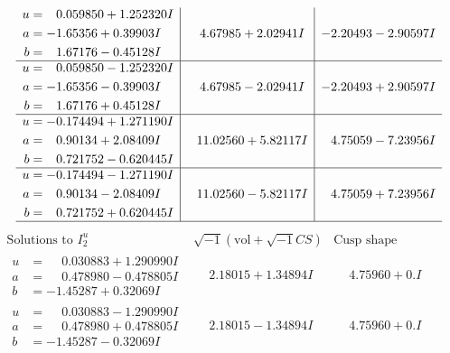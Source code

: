 \documentclass[1p]{elsarticle_modified}
\theoremstyle{definition}
\newcommand{\I}{\sqrt{-1}}
\begin{document}
$$\begin{array}{c|c|c}
\begin{aligned}
u &= \phantom{-}0.059850 + 1.252320 I \\
a &= -1.65356 + 0.39903 I \\
b &= \phantom{-}1.67176 - 0.45128 I\end{aligned}
 & \phantom{-}4.67985 + 2.02941 I & -2.20493 - 2.90597 I \\ \hline\begin{aligned}
u &= \phantom{-}0.059850 - 1.252320 I \\
a &= -1.65356 - 0.39903 I \\
b &= \phantom{-}1.67176 + 0.45128 I\end{aligned}
 & \phantom{-}4.67985 - 2.02941 I & -2.20493 + 2.90597 I \\ \hline\begin{aligned}
u &= -0.174494 + 1.271190 I \\
a &= \phantom{-}0.90134 + 2.08409 I \\
b &= \phantom{-}0.721752 - 0.620445 I\end{aligned}
 & \phantom{-}11.02560 + 5.82117 I & \phantom{-}4.75059 - 7.23956 I \\ \hline\begin{aligned}
u &= -0.174494 - 1.271190 I \\
a &= \phantom{-}0.90134 - 2.08409 I \\
b &= \phantom{-}0.721752 + 0.620445 I\end{aligned}
 & \phantom{-}11.02560 - 5.82117 I & \phantom{-}4.75059 + 7.23956 I\\
 \hline 
 \end{array}$$\newpage$$\begin{array}{c|c|c}  
\text{Solutions to }I^u_{2}& \I (\text{vol} + \sqrt{-1}CS) & \text{Cusp shape}\\
 \hline 
\begin{aligned}
u &= \phantom{-}0.030883 + 1.290990 I \\
a &= \phantom{-}0.478980 - 0.478805 I \\
b &= -1.45287 + 0.32069 I\end{aligned}
 & \phantom{-}2.18015 + 1.34894 I & \phantom{-}4.75960 + 0. I\phantom{ +0.000000I} \\ \hline\begin{aligned}
u &= \phantom{-}0.030883 - 1.290990 I \\
a &= \phantom{-}0.478980 + 0.478805 I \\
b &= -1.45287 - 0.32069 I\end{aligned}
 & \phantom{-}2.18015 - 1.34894 I & \phantom{-}4.75960 + 0. I\phantom{ +0.000000I} \\ \hline\begin{aligned}

\end{aligned}
\end{array}$$
\end{document}
